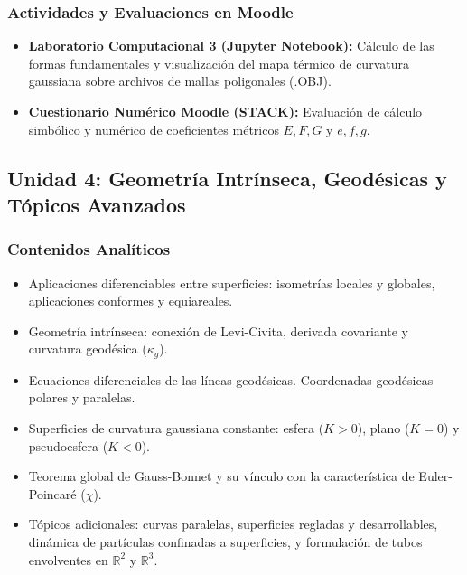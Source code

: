\documentclass[11pt, a4paper]{article}
\begin{document}
	\subsubsection*{Actividades y Evaluaciones en Moodle}
	\begin{itemize}
		\item \textbf{Laboratorio Computacional 3 (Jupyter Notebook):} Cálculo de las formas fundamentales y visualización del mapa térmico de curvatura gaussiana sobre archivos de mallas poligonales (.OBJ).
		\item \textbf{Cuestionario Numérico Moodle (STACK):} Evaluación de cálculo simbólico y numérico de coeficientes métricos $E, F, G$ y $e, f, g$.
	\end{itemize}
	
	\subsection{Unidad 4: Geometría Intrínseca, Geodésicas y Tópicos Avanzados}
	
	\subsubsection*{Contenidos Analíticos}
	\begin{itemize}
		\item Aplicaciones diferenciables entre superficies: isometrías locales y globales, aplicaciones conformes y equiareales.
		\item Geometría intrínseca: conexión de Levi-Civita, derivada covariante y curvatura geodésica ($\kappa_g$).
		\item Ecuaciones diferenciales de las líneas geodésicas. Coordenadas geodésicas polares y paralelas.
		\item Superficies de curvatura gaussiana constante: esfera ($K > 0$), plano ($K = 0$) y pseudoesfera ($K < 0$).
		\item Teorema global de Gauss-Bonnet y su vínculo con la característica de Euler-Poincaré ($\chi$).
		\item Tópicos adicionales: curvas paralelas, superficies regladas y desarrollables, dinámica de partículas confinadas a superficies, y formulación de tubos envolventes en $\mathbb{R}^2$ y $\mathbb{R}^3$.
	\end{itemize}
	
\end{document}
